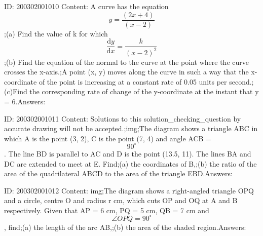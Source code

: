 \documentclass{article}
\begin{document}
ID: 200302001010
Content:
A curve has the equation $$ y=\frac{(2x+4)}{(x-2)}$$;(a)	Find the value of k for which $$ \frac{\mathrm{d} y}{\mathrm{d} x}=\frac{k}{(x-2)^2} $$;(b)	Find the equation of the normal to the curve at the point where the curve crosses the x-axis.;A point (x, y) moves along the curve in such a way that the x-coordinate of the point is increasing at a constant rate of 0.05 units per second.;(c)Find the corresponding rate of change of the y-coordinate at the instant that y = 6.Answers:

ID: 200302001011
Content:
Solutions to this solution_checking_question by accurate drawing will not be accepted.;img;The diagram shows a triangle ABC in which A is the point (3, 2), C is the point (7, 4) and angle ACB = $$90^{\circ}$$. The line BD is parallel to AC and D is the point (13.5, 11). The lines BA and DC are extended to meet at E. Find;(a)	the coordinates of B,;(b)	the ratio of the area of the quadrilateral ABCD to the area of the triangle EBD.Answers:

ID: 200302001012
Content:
img;The diagram shows a right-angled triangle OPQ and a circle, centre O and radius r cm, which cuts OP and OQ at A and B respectively. Given that AP = 6 cm, PQ = 5 cm, QB = 7 cm and $$\angle OPQ=90^{\circ}$$, find;(a)	the length of the arc AB,;(b)	the area of the shaded region.Answers:
\end{document}
